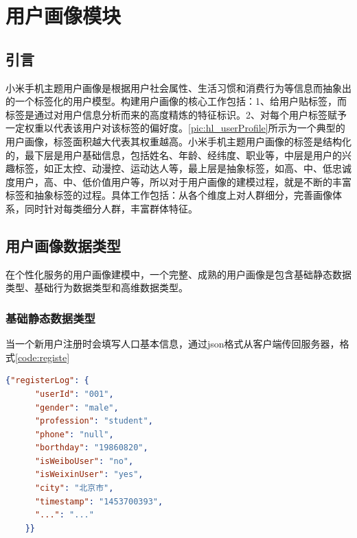 
\chapter{用户画像模块}
\section{引言}

小米手机主题用户画像是根据用户社会属性、生活习惯和消费行为等信息而抽象出的一个标签化的用户模型。构建用户画像的核心工作包括：1、给用户贴标签，而标签是通过对用户信息分析而来的高度精炼的特征标识。2、对每个用户标签赋予一定权重以代表该用户对该标签的偏好度。\autoref{pic:hl_userProfile}所示为一个典型的用户画像，标签面积越大代表其权重越高。小米手机主题用户画像的标签是结构化的，最下层是用户基础信息，包括姓名、年龄、经纬度、职业等，中层是用户的兴趣标签，如正太控、动漫控、运动达人等，最上层是抽象标签，如高、中、低忠诚度用户，高、中、低价值用户等，所以对于用户画像的建模过程，就是不断的丰富标签和抽象标签的过程。具体工作包括：从各个维度上对人群细分，完善画像体系，同时针对每类细分人群，丰富群体特征。


\section{用户画像数据类型}
在个性化服务的用户画像建模中，一个完整、成熟的用户画像是包含基础静态数据类型、基础行为数据类型和高维数据类型。
\subsection{基础静态数据类型}
当一个新用户注册时会填写人口基本信息，通过json格式从客户端传回服务器，格式\autoref{code:registe}
\begin{lstlisting}[language=json,firstnumber=1,label={code:registe}]
    {"registerLog": {
      "userId": "001",
      "gender": "male",
      "profession": "student",
      "phone": "null",
      "borthday": "19860820",
      "isWeiboUser": "no",
      "isWeixinUser": "yes",
      "city": "北京市",
      "timestamp": "1453700393",
      "...": "..."
    }}
\end{lstlisting}

